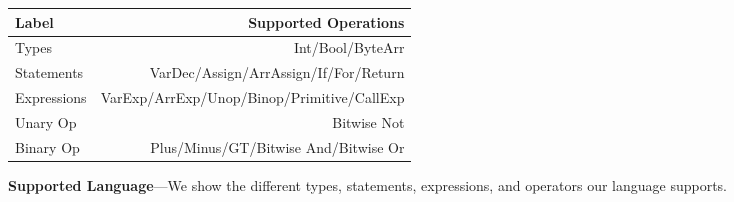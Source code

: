 \begin{figure}
        \centering
        \small
        \begin{tabularx}{\columnwidth}{lr}
        \toprule
        Label & Supported Operations\\
        \midrule
        Types &  Int/Bool/ByteArr \\
        Statements & VarDec/Assign/ArrAssign/If/For/Return \\
        Expressions & VarExp/ArrExp/Unop/Binop/Primitive/CallExp \\
        Unary Op &  Bitwise Not \\
        Binary Op & Plus/Minus/GT/Bitwise And/Bitwise Or \\
        \bottomrule
        \end{tabularx}
        \caption{\textbf{Supported Language}---We show the different types,
        statements, expressions, and operators our language supports.}
    \label{table:functions}
\end{figure}
